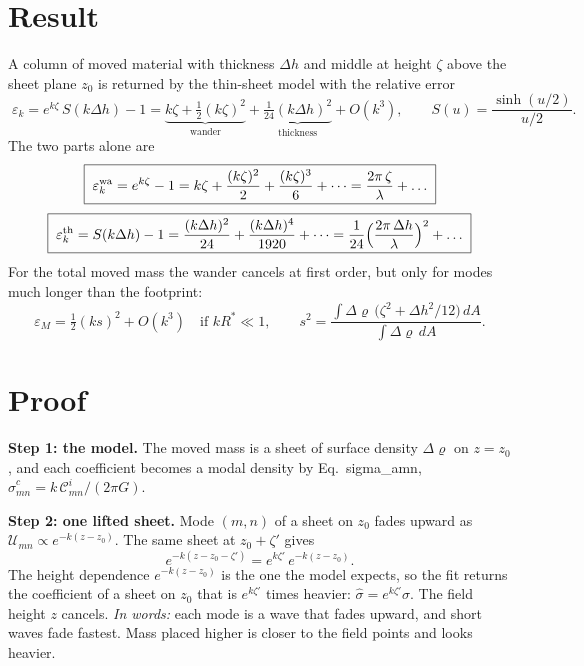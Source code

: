 \documentclass[11pt]{article}
\newcommand{\Ci}{\mathscr{C}^i}\newcommand{\U}{\mathcal{U}}
\newcommand{\D}[1]{\textsf{#1}}   %
\newcommand{\words}[1]{\emph{In words:} #1}
\begin{document}
\section*{Result}
A column of moved material with thickness $\Delta h$ and middle at height
$\zeta$ above the sheet plane $z_0$ is returned by the thin-sheet model with
the relative error
\begin{equation}
  \boxed{\;
  \varepsilon_k=e^{k\zeta}\,S(k\Delta h)-1
  =\underbrace{k\zeta+\tfrac12(k\zeta)^2}_{\text{wander}}
  +\underbrace{\tfrac1{24}(k\Delta h)^2}_{\text{thickness}}+O(k^3),
  \qquad S(u)=\frac{\sinh(u/2)}{u/2}.\;}
  \label{eq:err}
\end{equation}
The two parts alone are
\begin{equation}
  \boxed{\;\varepsilon^{\rm wa}_k=e^{k\zeta}-1=k\zeta+\frac{(k\zeta)^2}{2}+\frac{(k\zeta)^3}{6}+\dots
  =\frac{2\pi\,\zeta}{\lambda}+\dots\;}
  \label{eq:wa}
\end{equation}
\begin{equation}
  \boxed{\;\varepsilon^{\rm th}_k=S(k\Delta h)-1
  =\frac{(k\Delta h)^2}{24}+\frac{(k\Delta h)^4}{1920}+\dots
  =\frac{1}{24}\Big(\frac{2\pi\,\Delta h}{\lambda}\Big)^2+\dots\;}
  \label{eq:th}
\end{equation}
For the total moved mass the wander cancels at first order, but only for modes
much longer than the footprint:
\begin{equation}
  \boxed{\;\varepsilon_M=\tfrac12(ks)^2+O(k^3)\quad\text{if }kR^*\ll1,\qquad
  s^2=\frac{\int\Delta\varrho\,\big(\zeta^2+\Delta h^2/12\big)\,dA}{\int\Delta\varrho\,dA}.\;}
  \label{eq:M}
\end{equation}

\section*{Proof}

\textbf{Step 1: the model.} The moved mass is a sheet of surface density
$\Delta\varrho$ on $z=z_0$, and each coefficient becomes a modal density by
Eq.~\D{sigma\_amn},
$\hat\sigma^{c}_{mn}=k\,\Ci_{mn}/(2\pi G)$.

\textbf{Step 2: one lifted sheet.} Mode $(m,n)$ of a sheet on $z_0$ fades
upward as $\U_{mn}\propto e^{-k(z-z_0)}$. The same sheet at $z_0+\zeta'$ gives
\begin{equation}
  e^{-k(z-z_0-\zeta')}=e^{k\zeta'}\,e^{-k(z-z_0)} .
\end{equation}
The height dependence $e^{-k(z-z_0)}$ is the one the model expects, so the fit
returns the coefficient of a sheet on $z_0$ that is $e^{k\zeta'}$ times
heavier: $\hat\sigma=e^{k\zeta'}\sigma$. The field height $z$ cancels.
\words{each mode is a wave that fades upward, and short waves fade fastest.
Mass placed higher is closer to the field points and looks heavier.}
\end{document}
